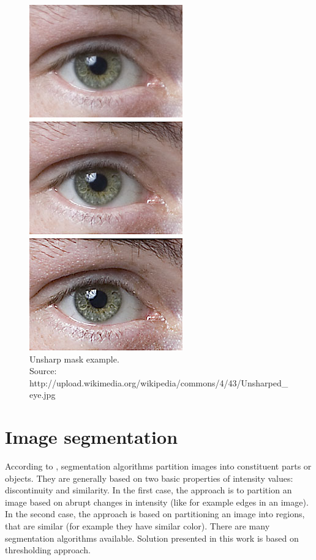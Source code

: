 \documentclass[a4paper,onecolumn,oneside,12pt]{memoir}
\begin{document}
\begin{figure}[ht]
\begin{center}
\includegraphics[scale=1.2]{images/unsharpMaskExample.jpg}
\caption{Unsharp mask example. \\
Source: http://upload.wikimedia.org/wikipedia/commons/4/43/Unsharped\_eye.jpg}
\label{unsharpMaskExample}
\end{center}
\end{figure}

\section{Image segmentation}

According to \cite{digitalImageProcessing}, segmentation algorithms partition images into
constituent parts or objects. They are generally based on two basic properties of intensity values:
discontinuity and similarity. In the first case, the approach is to partition an image based on
abrupt changes in intensity (like for example edges in an image). In the second case, the approach is
based on partitioning an image into regions, that are similar (for example they have similar color).
There are many segmentation algorithms available. Solution presented in this work is based on
thresholding approach.
\end{document}
